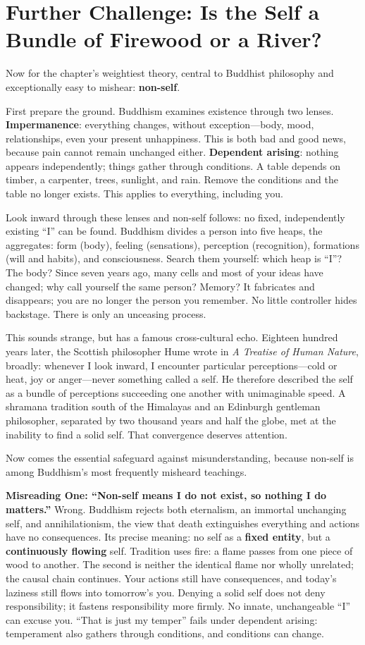 \section[Further Challenge: What Is the Self?]{Further Challenge: Is the Self a Bundle of Firewood or a River?}
Now for the chapter's weightiest theory, central to Buddhist philosophy and exceptionally easy to mishear: \textbf{non-self}.

First prepare the ground. Buddhism examines existence through two lenses. \textbf{Impermanence}: everything changes, without exception---body, mood, relationships, even your present unhappiness. This is both bad and good news, because pain cannot remain unchanged either. \textbf{Dependent arising}: nothing appears independently; things gather through conditions. A table depends on timber, a carpenter, trees, sunlight, and rain. Remove the conditions and the table no longer exists. This applies to everything, including you.

Look inward through these lenses and non-self follows: no fixed, independently existing ``I'' can be found. Buddhism divides a person into five heaps, the aggregates: form (body), feeling (sensations), perception (recognition), formations (will and habits), and consciousness. Search them yourself: which heap is ``I''? The body? Since seven years ago, many cells and most of your ideas have changed; why call yourself the same person? Memory? It fabricates and disappears; you are no longer the person you remember. No little controller hides backstage. There is only an unceasing process.

This sounds strange, but has a famous cross-cultural echo. Eighteen hundred years later, the Scottish philosopher Hume wrote in \textit{A Treatise of Human Nature}, broadly: whenever I look inward, I encounter particular perceptions---cold or heat, joy or anger---never something called a self. He therefore described the self as a bundle of perceptions succeeding one another with unimaginable speed. A shramana tradition south of the Himalayas and an Edinburgh gentleman philosopher, separated by two thousand years and half the globe, met at the inability to find a solid self. That convergence deserves attention.

Now comes the essential safeguard against misunderstanding, because non-self is among Buddhism's most frequently misheard teachings.

\textbf{Misreading One: ``Non-self means I do not exist, so nothing I do matters.''} Wrong. Buddhism rejects both eternalism, an immortal unchanging self, and annihilationism, the view that death extinguishes everything and actions have no consequences. Its precise meaning: no self as a \textbf{fixed entity}, but a \textbf{continuously flowing} self. Tradition uses fire: a flame passes from one piece of wood to another. The second is neither the identical flame nor wholly unrelated; the causal chain continues. Your actions still have consequences, and today's laziness still flows into tomorrow's you. Denying a solid self does not deny responsibility; it fastens responsibility more firmly. No innate, unchangeable ``I'' can excuse you. ``That is just my temper'' fails under dependent arising: temperament also gathers through conditions, and conditions can change.

